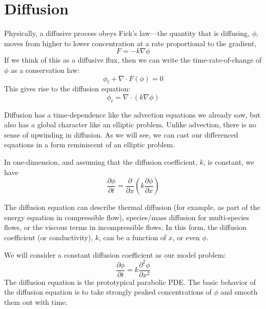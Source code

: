 \label{ch:diffusion}

\section{Diffusion}

Physically, a diffusive process obeys Fick's law---the quantity that is
diffusing, $\phi$, moves from higher to lower concentration at a rate
proportional to the gradient,
\begin{equation}
  F = - k \nabla \phi
\end{equation}
If we think of this as a diffusive flux, then we can write the time-rate-of-change of $\phi$ as a conservation law:
\begin{equation}
  \phi_t + \nabla\cdot F(\phi) = 0
\end{equation}
This gives rise to the diffusion equation:
\begin{equation}
\phi_t = \nabla \cdot (k \nabla \phi)
\end{equation}

Diffusion has a time-dependence like the advection equations we
already saw, but also has a global character like an elliptic problem.
Unlike advection, there is no sense of upwinding in diffusion.  As we
will see, we can cast our differenced equations in a form reminiscent
of an elliptic problem.

In one-dimension, and assuming that the diffusion coefficient, $k$, is 
constant, we have
\begin{equation}
\frac{\partial \phi}{\partial t} = 
  \frac{\partial }{\partial x} 
  \left ( k \frac{\partial \phi}{\partial x} \right )
\end{equation}


The diffusion equation can describe thermal diffusion (for example, as
part of the energy equation in compressible flow), species/mass
diffusion for multi-species flows, or the viscous terms in
incompressible flows.  In this form, the diffusion coefficient (or
conductivity), $k$, can be a function of $x$, or even $\phi$.  


We will consider a constant diffusion coefficient as our model problem:
\begin{equation}
\frac{\partial \phi}{\partial t} = k \frac{\partial^2 \phi}{\partial x^2}
\end{equation}
The diffusion equation is the prototypical parabolic PDE.
The basic behavior of the diffusion equation is to take strongly peaked
concentrations of $\phi$ and smooth them out with time.

